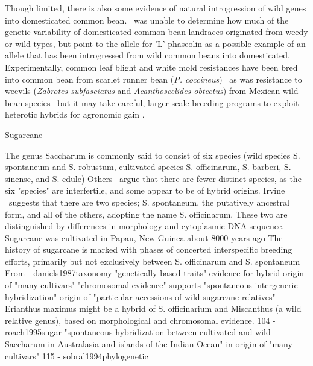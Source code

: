 \documentclass[11pt]{article}
\begin{document}
Though limited, there is also some evidence of natural introgression of wild genes into domesticated common bean.
\cite{papa2003asymmetry}\ was unable to determine how much of the genetic variability of domesticated common bean landraces originated from weedy or wild types, but point to the allele for 'L' phaseolin as a possible example of an allele that has been introgressed from wild common beans into domesticated.
Experimentally, common leaf blight and white mold resistances have been bred into common bean from scarlet runner bean (\emph{P. coccineus}) \cite{park1987transfer, schwartz2006inheritance}\, as was resistance to weevils (\emph{Zabrotes subfasciatus} and \emph{Acanthoscelides obtectus}) from Mexican wild bean species \cite{kornegay1991inheritance}\, but it may take careful, larger-scale breeding programs to exploit heterotic hybrids for agronomic gain \cite{paredes1995extensive}.














Sugarcane

The genus Saccharum is commonly said to consist of six species (wild species S. spontaneum and S. robustum, cultivated species S. officinarum, S. barberi, S. sinense, and S. edule) \cite{brandes1958origin, jackson2005breeding}\.
Others \cite{irvine1999saccharum}\ argue that there are fewer distinct species, as the six "species" are interfertile, and some appear to be of hybrid origins.
Irvine  \cite{irvine1999saccharum}\ suggests that there are two species; S. spontaneum, the putatively ancestral form, and all of the others, adopting the name S. officinarum.
These two are distinguished by differences in morphology and cytoplasmic DNA sequence.
Sugarcane was cultivated in Papau, New Guinea about 8000 years ago \cite{keyroyalbotanicalgardens, daniels1987taxonomy, artschwager1958sugarcane}\.
The history of sugarcane is marked with phases of concerted interspecific breeding efforts, primarily but not exclusively between S. officinarum and S. spontaneum \cite{roach1989origin}\.  

From \cite{ellstrand1999gene} - daniels1987taxonomy
    "genetically based traits" evidence for hybrid origin of "many cultivars"
    "chromosomal evidence" supports "spontaneous intergeneric hybridization" origin of "particular accessions of wild sugarcane relatives"
    Erianthus maximus might be a hybrid of S. officinarium and Miscanthus (a wild relative genus), based on morphological and chromosomal evidence.
104 - roach1995sugar
    "spontaneous hybridization between cultivated and wild Saccharum in Australasia and islands of the Indian Ocean" in origin of "many cultivars"
115 - sobral1994phylogenetic
    
\end{document}
